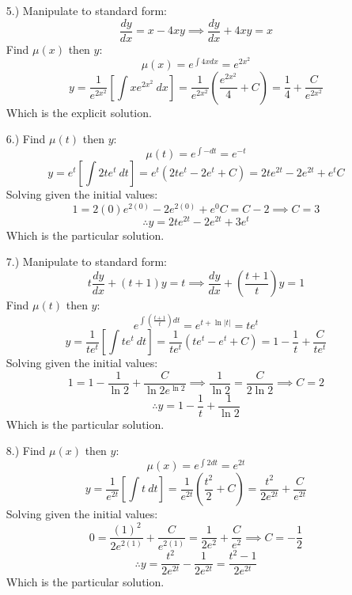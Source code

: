\documentclass[12pt]{article}
\newcommand{\bracks}[1]{\left[#1\right]}
\newcommand{\derv}[2]{\dfrac{d#1}{d#2}}
\begin{document}
\begin{itemize}
    \pagebreak
    \item [5.)] Manipulate to standard form:
    \begin{equation*}
        \derv{y}{x}=x-4xy\implies\derv{y}{x}+4xy=x
    \end{equation*}
    Find $\mu(x)$ then $y$:
    \begin{equation*}
        \mu(x)=e^{\int4xdx}=e^{2x^2}
    \end{equation*}
    \begin{equation*}
        y=\dfrac{1}{e^{2x^2}}\bracks{\int xe^{2x^2}\ dx}=\dfrac{1}{e^{2x^2}}\left(\dfrac{e^{2x^2}}{4}+C\right)=\dfrac{1}{4}+\dfrac{C}{e^{2x^2}}
    \end{equation*}
    Which is the explicit solution.

    \item [6.)] Find $\mu(t)$ then $y$:
    \[\mu(t)=e^{\int-dt}=e^{-t}\]
    \[y=e^t\bracks{\int2te^t\ dt}=e^t(2te^t-2e^t+C)=2te^{2t}-2e^{2t}+e^tC\]
    Solving given the initial values:
    \[1=2(0)e^{2(0)}-2e^{2(0)}+e^0C=C-2\implies C=3\]
    \[\therefore y=2te^{2t}-2e^{2t}+3e^t\]
    Which is the particular solution.

    \item [7.)] Manipulate to standard form:
    \[t\dfrac{dy}{dx}+(t+1)y=t\implies\dfrac{dy}{dx}+\left(\dfrac{t+1}{t}\right)y=1\]
    Find $\mu(t)$ then $y$:
    \[e^{\int\left(\frac{t+1}{t}\right)dt}=e^{t+\ln\vert t\vert}=te^t\]
    \[y=\dfrac{1}{te^t}\bracks{\int te^t\ dt}=\dfrac{1}{te^t}\left(te^t-e^t+C\right)=1-\dfrac{1}{t}+\dfrac{C}{te^t}\]
    Solving given the initial values:
    \[1=1-\dfrac{1}{\ln 2}+\dfrac{C}{\ln 2e^{\ln 2}}\implies\dfrac{1}{\ln 2}=\dfrac{C}{2\ln 2}\implies C=2\]
    \[\therefore y=1-\dfrac{1}{t}+\dfrac{1}{\ln 2}\]
    Which is the particular solution.

    \pagebreak
    \item [8.)] Find $\mu(x)$ then $y$:
    \[\mu(x)=e^{\int2dt}=e^{2t}\]
    \[y=\dfrac{1}{e^{2t}}\bracks{\int t\ dt}=\dfrac{1}{e^{2t}}\left(\dfrac{t^2}{2}+C\right)=\dfrac{t^2}{2e^{2t}}+\dfrac{C}{e^{2t}}\]
    Solving given the initial values:
    \[0=\dfrac{(1)^2}{2e^{2(1)}}+\dfrac{C}{e^{2(1)}}=\dfrac{1}{2e^2}+\dfrac{C}{e^2}\implies C=-\dfrac{1}{2}\]
    \[\therefore y=\dfrac{t^2}{2e^{2t}}-\dfrac{1}{2e^{2t}}=\dfrac{t^2-1}{2e^{2t}}\]
    Which is the particular solution.

\end{itemize}
\end{document}
